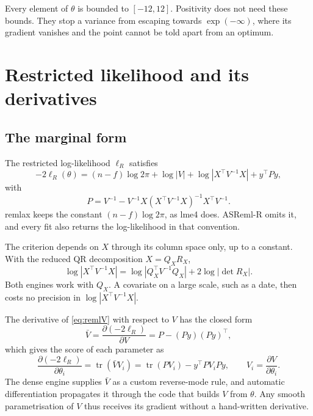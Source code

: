 \documentclass[article,nojss]{jss}
\renewcommand{\pkg}[1]{#1}
\newcommand{\tr}{\operatorname{tr}}
\begin{document}
Every element of $\theta$ is bounded to $[-12, 12]$. Positivity does not need
these bounds. They stop a variance from escaping towards $\exp(-\infty)$,
where its gradient vanishes and the point cannot be told apart from an
optimum.

\section{Restricted likelihood and its derivatives}\label{sec:reml}

\subsection{The marginal form}

The restricted log-likelihood $\ell_R$ satisfies
\begin{equation}\label{eq:remlV}
  -2\ell_R(\theta) = (n-f)\log 2\pi + \log|V| + \log|X^\top V^{-1} X| +
  y^\top P y,
\end{equation}
with
\begin{equation}\label{eq:P}
  P = V^{-1} - V^{-1}X(X^\top V^{-1}X)^{-1}X^\top V^{-1}.
\end{equation}
\pkg{remlax} keeps the constant $(n-f)\log 2\pi$, as \pkg{lme4} does.
\pkg{ASReml-R} omits it, and every fit also returns the log-likelihood in that
convention.

The criterion depends on $X$ through its column space only, up to a constant.
With the reduced QR decomposition $X = Q_X R_X$,
\begin{equation}\label{eq:qr}
  \log|X^\top V^{-1} X| = \log|Q_X^\top V^{-1} Q_X| + 2\log|\det R_X| .
\end{equation}
Both engines work with $Q_X$. A covariate on a large scale, such as a date,
then costs no precision in $\log|X^\top V^{-1}X|$.

The derivative of \eqref{eq:remlV} with respect to $V$ has the closed form
\begin{equation}\label{eq:adjoint}
  \bar V = \frac{\partial(-2\ell_R)}{\partial V} = P - (Py)(Py)^\top ,
\end{equation}
which gives the score of each parameter as
\begin{equation}\label{eq:scoreV}
  \frac{\partial(-2\ell_R)}{\partial\theta_i}
  = \tr(\bar V V_i) = \tr(P V_i) - y^\top P V_i P y,
  \qquad V_i = \frac{\partial V}{\partial\theta_i}.
\end{equation}
The dense engine supplies $\bar V$ as a custom reverse-mode rule, and automatic
differentiation propagates it through the code that builds $V$ from
$\theta$. Any smooth parametrisation of $V$ thus receives its gradient without
a hand-written derivative.
\end{document}
